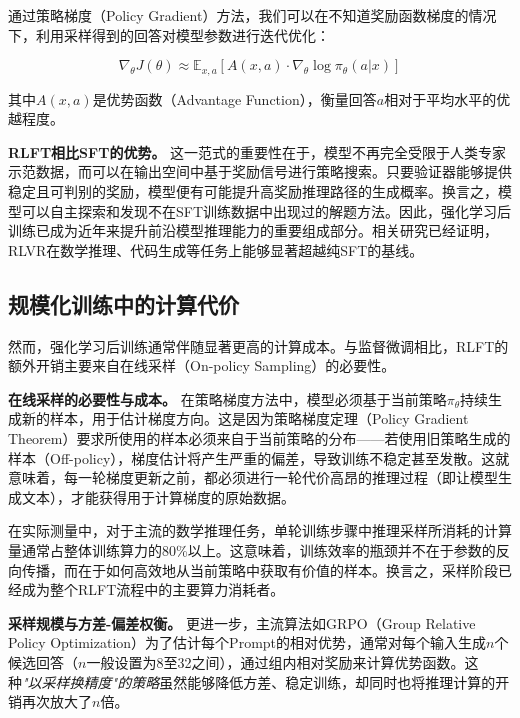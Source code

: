 通过策略梯度（Policy Gradient）方法\cite{williams1992simple}，我们可以在不知道奖励函数梯度的情况下，利用采样得到的回答对模型参数进行迭代优化：

\begin{equation}
\nabla_\theta J(\theta) \approx \mathbb{E}_{x, a} [A(x, a) \cdot \nabla_\theta \log \pi_\theta(a|x)]
\label{eq:pg_gradient}
\end{equation}

其中$A(x, a)$是优势函数（Advantage Function），衡量回答$a$相对于平均水平的优越程度。

\textbf{RLFT相比SFT的优势。} 这一范式的重要性在于，模型不再完全受限于人类专家示范数据，而可以在输出空间中基于奖励信号进行策略搜索。只要验证器能够提供稳定且可判别的奖励，模型便有可能提升高奖励推理路径的生成概率。换言之，模型可以自主探索和发现不在SFT训练数据中出现过的解题方法。因此，强化学习后训练已成为近年来提升前沿模型推理能力的重要组成部分。相关研究\cite{deepseek2024reasoning}已经证明，RLVR在数学推理、代码生成等任务上能够显著超越纯SFT的基线。

\subsection{规模化训练中的计算代价}
\label{subsec:computational_cost}

然而，强化学习后训练通常伴随显著更高的计算成本。与监督微调相比，RLFT的额外开销主要来自在线采样（On-policy Sampling）的必要性。

\textbf{在线采样的必要性与成本。} 在策略梯度方法中，模型必须基于当前策略$\pi_\theta$持续生成新的样本，用于估计梯度方向。这是因为策略梯度定理（Policy Gradient Theorem）\cite{sutton1999policy}要求所使用的样本必须来自于当前策略的分布——若使用旧策略生成的样本（Off-policy），梯度估计将产生严重的偏差，导致训练不稳定甚至发散。这就意味着，每一轮梯度更新之前，都必须进行一轮代价高昂的推理过程（即让模型生成文本），才能获得用于计算梯度的原始数据。

在实际测量中，对于主流的数学推理任务，单轮训练步骤中推理采样所消耗的计算量通常占整体训练算力的80\%以上。这意味着，训练效率的瓶颈并不在于参数的反向传播，而在于如何高效地从当前策略中获取有价值的样本。换言之，采样阶段已经成为整个RLFT流程中的主要算力消耗者。

\textbf{采样规模与方差-偏差权衡。} 更进一步，主流算法如GRPO（Group Relative Policy Optimization）\cite{gao2024grpo}为了估计每个Prompt的相对优势，通常对每个输入生成$n$个候选回答（$n$一般设置为8至32之间），通过组内相对奖励来计算优势函数。这种\textit{"以采样换精度"的策略}虽然能够降低方差、稳定训练，却同时也将推理计算的开销再次放大了$n$倍。

